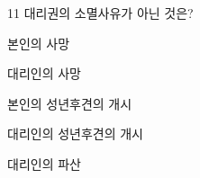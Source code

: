 \begin{question}{11}
대리권의 소멸사유가 아닌 것은?
\begin{choices}
  \item 본인의 사망
  \item 대리인의 사망
  \item 본인의 성년후견의 개시
  \item 대리인의 성년후견의 개시
  \item 대리인의 파산
\end{choices}
\end{question}
